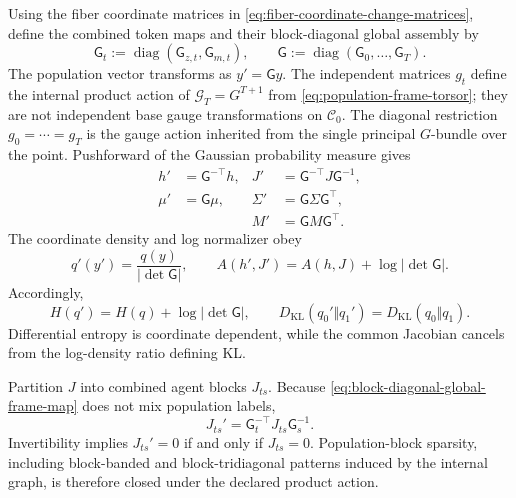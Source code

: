 Using the fiber coordinate matrices in \cref{eq:fiber-coordinate-change-matrices}, define the combined token maps and their block-diagonal global assembly by
\begin{equation}
\mathsf G_t
:=\operatorname{diag}(\mathsf G_{z,t},\mathsf G_{m,t}),
\qquad
\mathsf G
:=\operatorname{diag}(\mathsf G_0,\ldots,\mathsf G_T).
\label{eq:block-diagonal-global-frame-map}
\end{equation}
The population vector transforms as $y'=\mathsf G y$. The independent matrices $g_t$ define the internal product action of $\mathcal G_T=G^{T+1}$ from \cref{eq:population-frame-torsor}; they are not independent base gauge transformations on $\mathcal C_0$. The diagonal restriction $g_0=\cdots=g_T$ is the gauge action inherited from the single principal $G$-bundle over the point. Pushforward of the Gaussian probability measure gives
\begin{equation}
\begin{aligned}
h'&=\mathsf G^{-\top}h,
&J'&=\mathsf G^{-\top}J\mathsf G^{-1},\\
\mu'&=\mathsf G\mu,
&\Sigma'&=\mathsf G\Sigma\mathsf G^\top,\\
&&M'&=\mathsf G M\mathsf G^\top.
\end{aligned}
\label{eq:joint-gaussian-gauge-laws}
\end{equation}
The coordinate density and log normalizer obey
\begin{equation}
q'(y')=\frac{q(y)}{|\det\mathsf G|},
\qquad
A(h',J')=A(h,J)+\log|\det\mathsf G|.
\label{eq:joint-density-log-normalizer-jacobian}
\end{equation}
Accordingly,
\begin{equation}
H(q')=H(q)+\log|\det\mathsf G|,
\qquad
D_{\mathrm{KL}}(q_0'\Vert q_1')
=D_{\mathrm{KL}}(q_0\Vert q_1).
\label{eq:entropy-shift-kl-invariance}
\end{equation}
Differential entropy is coordinate dependent, while the common Jacobian cancels from the log-density ratio defining KL.

Partition $J$ into combined agent blocks $J_{ts}$. Because \cref{eq:block-diagonal-global-frame-map} does not mix population labels,
\begin{equation}
J_{ts}'
=\mathsf G_t^{-\top}J_{ts}\mathsf G_s^{-1}.
\label{eq:precision-token-block-gauge-law}
\end{equation}
Invertibility implies $J_{ts}'=0$ if and only if $J_{ts}=0$. Population-block sparsity, including block-banded and block-tridiagonal patterns induced by the internal graph, is therefore closed under the declared product action.

